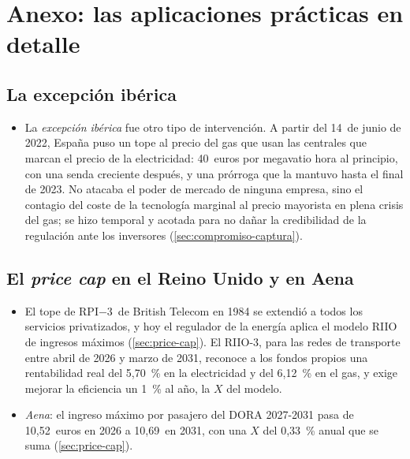 \documentclass[11pt]{article}
\begin{document}
\section{Anexo: las aplicaciones prácticas en detalle}\label{anexo:aplicaciones-detalle}

\subsection{La excepción ibérica}\label{anexo:excepcion-iberica}

\begin{itemize}
\item La \emph{excepción ibérica} fue otro tipo de intervención. A partir del 14~de junio de 2022, España puso un tope al precio del gas que usan las centrales que marcan el precio de la electricidad: 40~euros por megavatio hora al principio, con una senda creciente después, y una prórroga que la mantuvo hasta el final de 2023\nocite{BOE2022RDL10,BOE2022OrdenTED517,BOE2023RDL3}. No atacaba el poder de mercado de ninguna empresa, sino el contagio del coste de la tecnología marginal al precio mayorista en plena crisis del gas; se hizo temporal y acotada para no dañar la credibilidad de la regulación ante los inversores (\ref{sec:compromiso-captura}).
\end{itemize}

\subsection{El \emph{price cap} en el Reino Unido y en Aena}\label{anexo:riio}

\begin{itemize}
\item El tope de RPI$-$3~de British Telecom en 1984 se extendió a todos los servicios privatizados, y hoy el regulador de la energía aplica el modelo RIIO de ingresos máximos (\ref{sec:price-cap}). El RIIO-3, para las redes de transporte entre abril de 2026 y marzo de 2031, reconoce a los fondos propios una rentabilidad real del 5,70~\% en la electricidad y del 6,12~\% en el gas\nocite{Ofgem2025RIIO3Finanzas}, y exige mejorar la eficiencia un 1~\% al año, la $X$ del modelo\nocite{Ofgem2025RIIO3ET}.
\item \emph{Aena}: el ingreso máximo por pasajero del DORA 2027-2031 pasa de 10,52~euros en 2026 a 10,69~en 2031, con una $X$ del 0,33~\% anual que se suma (\ref{sec:price-cap})\nocite{BOE2026DORA}.
\end{itemize}
\end{document}
